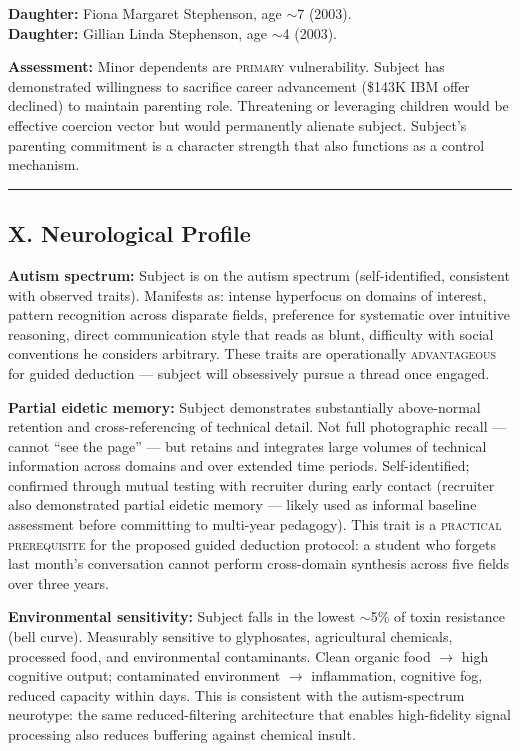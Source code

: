 \textbf{Daughter:} Fiona Margaret Stephenson, age $\sim$7 (2003).\\
\textbf{Daughter:} Gillian Linda Stephenson, age $\sim$4 (2003).

\textbf{Assessment:} Minor dependents are \textsc{primary} vulnerability. Subject has demonstrated willingness to sacrifice career advancement (\$143K IBM offer declined) to maintain parenting role. Threatening or leveraging children would be effective coercion vector but would permanently alienate subject. Subject's parenting commitment is a character strength that also functions as a control mechanism.

\vspace{1cm}\hrule\vspace{1cm}

\subsection*{X. Neurological Profile}
\label{interlude:neurological-profile}

\textbf{Autism spectrum:} Subject is on the autism spectrum (self-identified, consistent with observed traits). Manifests as: intense hyperfocus on domains of interest, pattern recognition across disparate fields, preference for systematic over intuitive reasoning, direct communication style that reads as blunt, difficulty with social conventions he considers arbitrary. These traits are operationally \textsc{advantageous} for guided deduction --- subject will obsessively pursue a thread once engaged.

\textbf{Partial eidetic memory:} Subject demonstrates substantially above-normal retention and cross-referencing of technical detail. Not full photographic recall --- cannot ``see the page'' --- but retains and integrates large volumes of technical information across domains and over extended time periods. Self-identified; confirmed through mutual testing with recruiter during early contact (recruiter also demonstrated partial eidetic memory --- likely used as informal baseline assessment before committing to multi-year pedagogy). This trait is a \textsc{practical prerequisite} for the proposed guided deduction protocol: a student who forgets last month's conversation cannot perform cross-domain synthesis across five fields over three years.

\textbf{Environmental sensitivity:} Subject falls in the lowest $\sim$5\% of toxin resistance (bell curve). Measurably sensitive to glyphosates, agricultural chemicals, processed food, and environmental contaminants. Clean organic food $\rightarrow$ high cognitive output; contaminated environment $\rightarrow$ inflammation, cognitive fog, reduced capacity within days. This is consistent with the autism-spectrum neurotype: the same reduced-filtering architecture that enables high-fidelity signal processing also reduces buffering against chemical insult.

